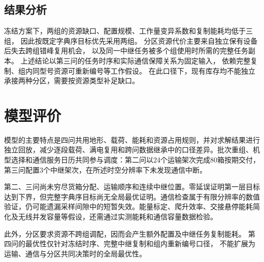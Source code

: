 \documentclass[bwprint]{gmcmthesis}
\begin{document}
\subsection{结果分析}
冻结方案下，两组的资源缺口、配置规模、工作量变异系数和复制能耗均低于三组，
因此按既定字典序目标优先采用两组。
分区资源代价主要来自独立保有设备后失去跨组错峰复用机会，
以及同一中继任务被多个组使用时所需的完整任务副本。
上述结论以第三问的任务时序和实际通信保障关系为固定输入，
依赖完整复制、组内同型号资源可重新编号等工作假设。
在此口径下，现有库存均不能独立承接两种分区，需要按资源类型补足缺口。

\section{模型评价}

模型的主要特点是四问共用地形、载荷、能耗和资源占用规则，并对求解结果进行独立回放，减少逐段载荷、满电复用和跨问数据继承中的口径差异。批次重组、机型选择和通信服务日历共同参与调度：第二问以24个运输架次完成80箱按期交付，第三问配置3个中继架次，在所述时空分辨率下未发现通信中断。

第二、三问尚未穷尽货箱分配、运输顺序和连续中继位置。零延误证明第一层目标达到下界，但完整字典序目标尚无全局最优证明。通信检查属于有限分辨率的数值验证，仍可能遗漏采样间隙中的短暂失效。能量标定、爬升效率、交接悬停能耗简化及无线并发容量等假设，还需通过实测能耗和通信容量数据检验。

此外，分区要求资源不跨组调配，因而会产生额外配置及中继任务复制能耗。
第四问的最优性仅针对冻结时序、完整中继复制和组内重新编号口径，
不能扩展为运输、通信与分区共同决策时的全局最优性。





\end{document}
